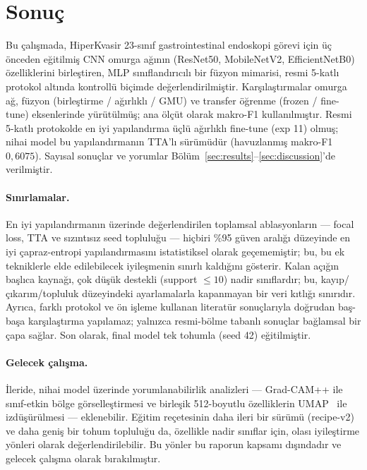 \section{Sonuç}
\label{sec:conclusion}

Bu çalışmada, HiperKvasir 23-sınıf gastrointestinal endoskopi görevi için üç
önceden eğitilmiş CNN omurga ağının (ResNet50, MobileNetV2, EfficientNetB0)
özelliklerini birleştiren, MLP sınıflandırıcılı bir füzyon mimarisi, resmi
5-katlı protokol altında kontrollü biçimde değerlendirilmiştir. Karşılaştırmalar
omurga ağ, füzyon (birleştirme / ağırlıklı / GMU) ve transfer öğrenme (frozen /
fine-tune) eksenlerinde yürütülmüş; ana ölçüt olarak makro-F1 kullanılmıştır.
Resmi 5-katlı protokolde en iyi yapılandırma üçlü ağırlıklı fine-tune (exp 11)
olmuş; nihai model bu yapılandırmanın TTA'lı sürümüdür (havuzlanmış
makro-F1 $0{,}6075$). Sayısal sonuçlar ve yorumlar
Bölüm~\ref{sec:results}--\ref{sec:discussion}'de verilmiştir.

\paragraph{Sınırlamalar.}
En iyi yapılandırmanın üzerinde değerlendirilen toplamsal ablasyonların --- focal
loss, TTA ve sızıntısız seed topluluğu --- hiçbiri \%95 güven aralığı düzeyinde
en iyi çapraz-entropi yapılandırmasını istatistiksel olarak geçememiştir; bu, bu
ek tekniklerle elde edilebilecek iyileşmenin sınırlı kaldığını gösterir. Kalan açığın başlıca kaynağı, çok düşük destekli
(support $\le 10$) nadir sınıflardır; bu, kayıp/çıkarım/topluluk düzeyindeki
ayarlamalarla kapanmayan bir veri kıtlığı sınırıdır. Ayrıca, farklı protokol ve
ön işleme kullanan literatür sonuçlarıyla doğrudan baş-başa karşılaştırma
yapılamaz; yalnızca resmi-bölme tabanlı sonuçlar bağlamsal bir çapa sağlar. Son
olarak, final model tek tohumla (seed 42) eğitilmiştir.

\paragraph{Gelecek çalışma.}
İleride, nihai model üzerinde yorumlanabilirlik analizleri --- Grad-CAM++
\cite{chattopadhyay2018gradcampp} ile sınıf-etkin bölge görselleştirmesi ve
birleşik 512-boyutlu özelliklerin UMAP~\cite{mcinnes2018umap} ile izdüşürülmesi
--- eklenebilir. Eğitim reçetesinin daha ileri bir sürümü (recipe-v2) ve daha
geniş bir tohum topluluğu da, özellikle nadir sınıflar için, olası iyileştirme
yönleri olarak değerlendirilebilir. Bu yönler bu raporun kapsamı dışındadır ve
gelecek çalışma olarak bırakılmıştır.
